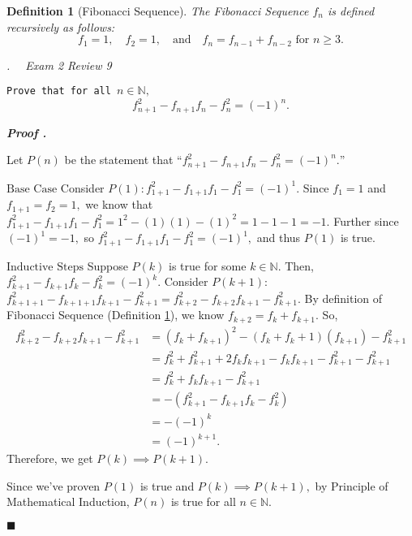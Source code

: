 \documentclass[11pt,letter]{article}
\newcounter{nq}[section]
\newcounter{np}[section]
\newtheorem{df}{Definition}[section]
\newenvironment*{p}{\par\noindent\textbf{\textit{Proof \stepcounter{np}\thenp. }}\par}{\par\hfill $\blacksquare$\par}
\newenvironment*{q}[1]{\noindent\emph{\thesection.\stepcounter{nq}\thenq$\quad $ #1}\par\noindent\texttt}{}
\def\N{{\mathbb{N}}}
\begin{document}
\begin{df}[Fibonacci Sequence]\label{FibSeq}
The Fibonacci Sequence $f_n$ is defined recursively as follows: \[f_1=1,\quad f_2=1,\quad\text{and}\quad f_n=f_{n-1}+f_{n-2}\text{ for }n\geq3.\]	
\end{df}

\begin{framed}\begin{q}
	{Exam 2 Review 9}
	{Prove that for all $n\in\N,$ \[f_{n+1}^2-f_{n+1}f_n-f_n^2=(-1)^n.\]}
\end{q}\end{framed}
\begin{p}
	Let $P(n)$ be the statement that ``$f_{n+1}^2-f_{n+1}f_n-f_n^2=(-1)^n.$''\par 
	$\boxed{\text{Base Case}}$ Consider $P(1): f_{1+1}^2-f_{1+1}f_1-f_1^2=(-1)^1.$ Since $f_1=1$ and $f_{1+1}=f_2=1,$ we know that $f_{1+1}^2-f_{1+1}f_1-f_1^2=1^2-(1)(1)-(1)^2=1-1-1=-1.$ Further since $(-1)^1=-1,$ so $f_{1+1}^2-f_{1+1}f_1-f_1^2=(-1)^1,$ and thus $P(1)$ is true.\par 
	$\boxed{\text{Inductive Steps}}$ Suppose $P(k)$ is true for some $k\in\N.$ Then, $f_{k+1}^2-f_{k+1}f_k-f_k^2=(-1)^k.$ Consider $P(k+1):$ $f_{k+1+1}^2-f_{k+1+1}f_{k+1}-f_{k+1}^2=f_{k+2}^2-f_{k+2}f_{k+1}-f_{k+1}^2.$ By definition of Fibonacci Sequence (Definition \ref{FibSeq}), we know $f_{k+2}=f_k+f_{k+1}.$ So, \[\begin{aligned}f_{k+2}^2-f_{k+2}f_{k+1}-f_{k+1}^2&=(f_k+f_{k+1})^2-(f_k+f_k+1)(f_{k+1})-f_{k+1}^2\\&=f_k^2+f_{k+1}^2+2f_{k}f_{k+1}-f_kf_{k+1}-f_{k+1}^2-f_{k+1}^2\\&=f_k^2+f_{k}f_{k+1}-f_{k+1}^2\\&=-(f_{k+1}^2-f_{k+1}f_{k}-f_k^2)\\&=-(-1)^k\\&=(-1)^{k+1}.\end{aligned}\] Therefore, we get $P(k)\implies P(k+1).$\par Since we've proven $P(1)$ is true and $P(k)\implies P(k+1),$ by Principle of Mathematical Induction, $P(n)$ is true for all $n\in\N.$
\end{p}
\end{document}
